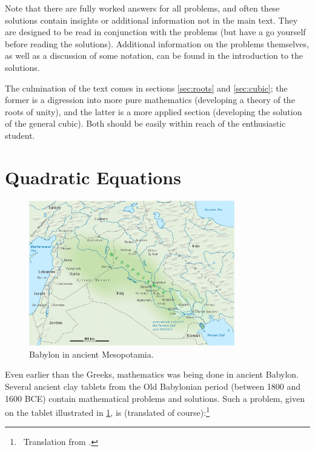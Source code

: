 \documentclass[a4paper,10pt,titlepage]{article}
\theoremstyle{definition}
\begin{document}
Note that there are fully worked answers for all problems, and often these solutions
contain insights or additional information not in the main text. They are designed to
be read in conjunction with the problems (but have a go yourself before reading the
solutions). Additional information on the problems themselves, as well as a discussion
of some notation, can be found in the introduction to the solutions.

The culmination of the text comes in sections \ref{sec:roots} and \ref{sec:cubic}; the former is a digression
into more pure mathematics (developing a theory of the roots of unity), and the latter
is a more applied section (developing the solution of the general cubic). Both should
be easily within reach of the enthusiastic student.

\section{Quadratic Equations}\label{sec:quadratic}
\begin{figure}
  \centering
  \includegraphics[width=0.8\textwidth]{meso}
  \caption[blag]{Babylon in ancient Mesopotamia.\footnotemark\label{fig:babylon2}}
\end{figure}

Even earlier than the Greeks, mathematics was being done in ancient Babylon.
Several ancient clay tablets from the Old Babylonian period (between 1800 and 1600 BCE)
contain mathematical problems and solutions. Such a problem, given on the tablet
illustrated in \cref{fig:babylon2}, is (translated of course):\footnote{~Translation from \cite{Ste08}.}
\end{document}
